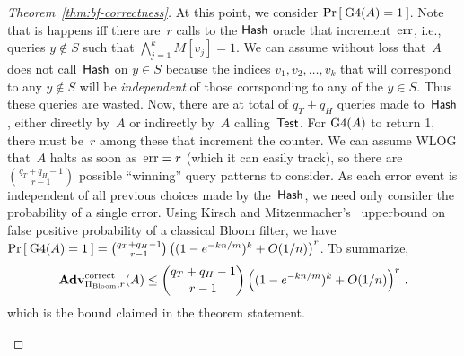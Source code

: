 \begin{proof}[Theorem~\ref{thm:bf-correctness}]
At this point, we consider $\Pr\left[\: \text{G4}(A)=1 \:\right]$.  Note that is
happens iff there are~$r$ calls to the $\mathsf{Hash}$ oracle that
increment~$\mathrm{err}$, i.e., queries $y \not\in S$ such that
$\bigwedge_{j=1}^{k} M[v_j]=1$.  We can assume without loss that~$A$
does not call~$\mathsf{Hash}$ on $y \in S$ because the indices
$v_1,v_2,\ldots,v_k$ that will correspond to any $y \not\in S$ will be
\emph{independent} of those corrsponding to any of the $y \in S$.
Thus these queries are wasted.  Now, there are at total of $q_T + q_H$
queries made to~$\mathsf{Hash}$, either directly by~$A$ or indirectly
by~$A$ calling~$\mathsf{Test}$.  For $\text{G4}(A)$ to return 1, there
must be~$r$ among these that increment the counter.  We can assume
WLOG that~$A$ halts as soon as~$\mathrm{err}=r$ (which it can easily track),
so there are $\binom{q_T+q_H-1}{r-1}$ possible ``winning'' query
patterns to consider.  As each error event is independent of all
previous choices made by the~$\mathsf{Hash}$, we need only consider the
probability of a single error. Using Kirsch and Mitzenmacher's~\cite{kirsch2006less} upperbound on false positive probability of a classical Bloom filter, 
we have  $\Pr\left[\: \text{G4}(A)=1 \:\right] = \binom{q_T+q_H-1}{r-1}\left( (1-e^{-kn/m})^k + O(1/n) \right)^r$.
To summarize, 
\[
\mathrm{\mathbf{Adv}}^{\mathrm{correct}}_{\Pi_{\mathrm{Bloom}},r}(A) \leq  {\dbinom{q_T + q_H-1}{r-1}} \left( (1-e^{-kn/m})^k + O(1/n) \right)^r\,.
\]
which is the bound claimed in the theorem statement.
\begin{figure}[tp]
\end{figure}
\end{proof}
